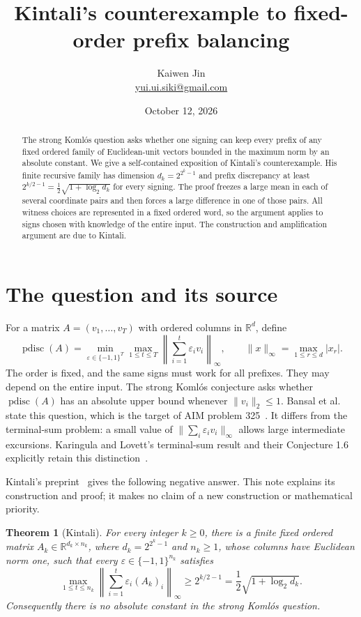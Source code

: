 \documentclass[11pt]{article}
\title{Kintali's counterexample to fixed-order prefix balancing}
\author{Kaiwen Jin\\\small\href{mailto:yui.ui.siki@gmail.com}{yui.ui.siki@gmail.com}}
\date{October 12, 2026}
\newtheorem{theorem}{Theorem}
\newcommand{\R}{\mathbb R}
\newcommand{\pdisc}{\operatorname{pdisc}}
\begin{document}
\maketitle
\begin{abstract}
The strong Koml\'os question asks whether one signing can keep every
prefix of any fixed ordered family of Euclidean-unit vectors bounded
in the maximum norm by an absolute constant. We give a self-contained
exposition of Kintali's counterexample. His finite recursive family has
dimension $d_k=2^{2^k-1}$ and prefix discrepancy at least
$2^{k/2-1}=\tfrac12\sqrt{1+\log_2d_k}$ for every signing.
The proof freezes a large mean in each of several coordinate pairs and
then forces a large difference in one of those pairs. All witness choices
are represented in a fixed ordered word, so the argument applies to
signs chosen with knowledge of the entire input. The construction and
amplification argument are due to Kintali.
\end{abstract}

\section{The question and its source}

For a matrix $A=(v_1,\ldots,v_T)$ with ordered columns in $\R^d$, define
\[
\pdisc(A)=\min_{\varepsilon\in\{-1,1\}^T}
\max_{1\le t\le T}\left\|\sum_{i=1}^t\varepsilon_i v_i\right\|_\infty,
\qquad \|x\|_\infty=\max_{1\le r\le d}|x_r|.
\]
The order is fixed, and the same signs must work for all prefixes.
They may depend on the entire input. The strong Koml\'os conjecture asks
whether $\pdisc(A)$ has an absolute upper bound whenever
$\|v_i\|_2\le1$. Bansal et al.~\cite[Open Problem 6.1]{bansal} state
this question, which is the target of AIM problem 325~\cite{aim}.
It differs from the terminal-sum problem: a small value of
$\|\sum_i\varepsilon_i v_i\|_\infty$ allows large intermediate
excursions. Karingula and Lovett's terminal-sum result and their
Conjecture 1.6 explicitly retain this distinction~\cite{karingula}.

Kintali's preprint~\cite[Lemma 2.2 and Theorem 3.1]{kintali} gives
the following negative answer. This note explains its construction and
proof; it makes no claim of a new construction or mathematical priority.

\begin{theorem}[Kintali]\label{thm:main}
For every integer $k\ge0$, there is a finite fixed ordered matrix
$A_k\in\R^{d_k\times n_k}$, where $d_k=2^{2^k-1}$ and $n_k\ge1$,
whose columns have Euclidean norm one, such that every
$\varepsilon\in\{-1,1\}^{n_k}$ satisfies
\begin{equation}\label{eq:main}
\max_{1\le t\le n_k}\left\|\sum_{i=1}^t
\varepsilon_i(A_k)_i\right\|_\infty
\ge 2^{k/2-1}=\frac12\sqrt{1+\log_2d_k}.
\end{equation}
Consequently there is no absolute constant in the strong Koml\'os question.
\end{theorem}
\end{document}
